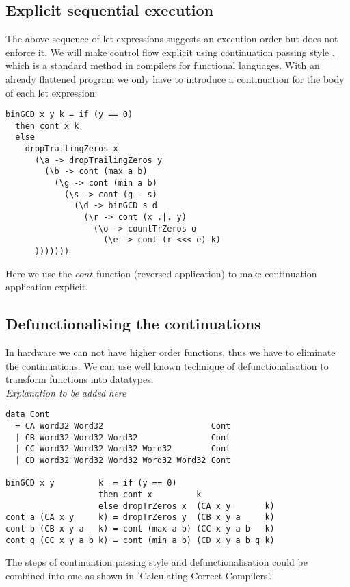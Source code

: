 \documentclass[preprint]{sigplanconf}
\def\codefamily{\sffamily\normalsize}
\def\codesmall{\sffamily\small}
\begin{document}
\subsection{Explicit sequential execution}
The above sequence of let expressions suggests an execution order but does not enforce it.
We will make control flow explicit using continuation passing style \cite{AppelCwC}, which is a standard method in compilers for functional languages.
With an already flattened program we only have to introduce a continuation for the body of each let expression:
\begin{lstlisting}
binGCD x y k = if (y == 0)
  then cont x k
  else
    dropTrailingZeros x
      (\a -> dropTrailingZeros y
        (\b -> cont (max a b)
          (\g -> cont (min a b)
            (\s -> cont (g - s)
              (\d -> binGCD s d
                (\r -> cont (x .|. y)
                  (\o -> countTrZeros o
                    (\e -> cont (r <<< e) k)
      )))))))
\end{lstlisting}
Here we use the $cont$ function (reversed application) to make continuation application explicit.

\subsection{Defunctionalising the continuations}
In hardware we can not have higher order functions, thus we have to eliminate the continuations.
We can use well known technique of defunctionalisation \cite{Reynolds} to transform functions into datatypes. \\

\textit{Explanation to be added here}

\lstset{basicstyle=\codesmall}
\begin{lstlisting}
data Cont
  = CA Word32 Word32                      Cont
  | CB Word32 Word32 Word32               Cont
  | CC Word32 Word32 Word32 Word32        Cont
  | CD Word32 Word32 Word32 Word32 Word32 Cont

binGCD x y         k  = if (y == 0)
                   then cont x         k
                   else dropTrZeros x  (CA x y       k)
cont a (CA x y     k) = dropTrZeros y  (CB x y a     k)
cont b (CB x y a   k) = cont (max a b) (CC x y a b   k)
cont g (CC x y a b k) = cont (min a b) (CD x y a b g k)
\end{lstlisting}
\lstset{basicstyle=\codefamily}

The steps of continuation passing style and defunctionalisation could be combined into one as shown in 'Calculating Correct Compilers'\cite{CCC}.
\end{document}
